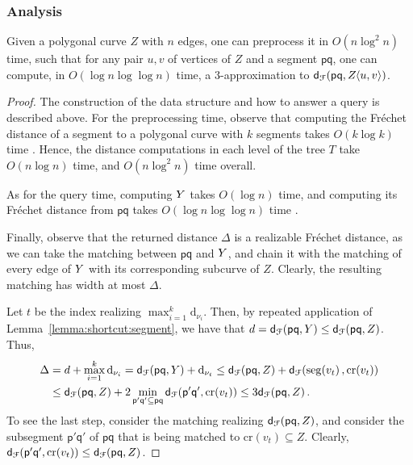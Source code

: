 \documentclass[12pt]{article}
\newcommand{\lemlab}[1]{\label{lemma:#1}}
\newcommand{\lemref}[1]{Lemma~\ref{lemma:#1}}
\newcommand{\ts}{\hspace{0.6pt}}
\newcommand{\Frechet}{Fr\'{e}c{h}e{}t\xspace}\providecommand{\Arr}{\mathop{\mathrm{\EuScript{A}}}}
\newcommand{\distFr}[2]{\mathsf{d}_{\EuScript{F}}\pth{#1, #2}}
\newcommand{\pnt}{\mathsf{p}}
\newcommand{\pntA}{\mathsf{q}}
\newcommand{\SimplifyX}[1]{#1}
\newcommand{\cZ}{{Z}}
\newcommand{\cY}{\SimplifyX{\cYBase}}
\providecommand{\pth}[2][\!]{#1\left({#2}\right)}
\newcommand{\SC}[3]{{#1}\!\!\ts\ts \left\langle  #2, #3 \right\rangle}
\newcommand{\Tree}{T}
\newcommand{\node}{\nu}
\newcommand{\cNode}[1]{\mathrm{c{}r}\pth{#1}}
\newcommand{\segNode}[1]{\mathrm{s{e}g}\pth{#1}}
\newcommand{\frNode}[1]{\mathrm{d}_{#1}}
\numberwithin{figure}{section}
\numberwithin{equation}{section}
\newcommand{\matching}{matching\xspace}
\begin{document}
\subsubsection{Analysis}

\begin{lemma}
    \lemlab{easy:shortcut}Given a polygonal curve $\cZ$ with $n$ edges, one can preprocess
    it in $O(n \log^2 n)$ time, such that for any pair $u,v$ of
    vertices of $\cZ$ and a segment $\pnt \pntA$, one can compute, in
    $O( \log n \log \log n)$ time, a $3$-approximation to
    $\distFr{\pnt\pntA} {\SC{\cZ}{u}{v}}$.
\end{lemma}

\begin{proof}
    The construction of the data structure and how to answer a query
    is described above. For the preprocessing time, observe that
    computing the \Frechet distance of a segment to a polygonal curve
    with $k$ segments takes $O(k \log k)$ time
    \cite{ag-cfdbt-95}. Hence, the distance computations in each level
    of the tree $\Tree$ take $O(n \log n)$ time, and $O(n \log^2 n)$
    time overall.
    
    As for the query time, computing $\cY$ takes $O( \log n)$ time,
    and computing its \Frechet distance from $\pnt \pntA$ takes $O(
    \log n \log \log n)$ time \cite{ag-cfdbt-95}.
    
    Finally, observe that the returned distance $\Delta$ is a
    realizable \Frechet distance, as we can take the \matching{}
    between $\pnt \pntA$ and $\cY$, and chain it with the \matching{}
    of every edge of $\cY$ with its corresponding subcurve of
    $\cZ$. Clearly, the resulting \matching{} has width at most
    $\Delta$.
    
    Let $t$ be the index realizing $\max_{i=1}^k
    \frNode{\node_i}$. Then, by repeated application of
    \lemref{shortcut:segment}, we have that $d = \distFr{\pnt
       \pntA}{\cY} \le \distFr{\pnt \pntA}{\cZ}$. Thus,
    \begin{align*}
        \Delta &= d + \max_{i=1}^k \frNode{\node_i}=\distFr{\pnt \pntA}{\cY} + \frNode{\node_t}\leq \distFr{\pnt \pntA}{\cZ} +
        \distFr{\segNode{v_t}}{\cNode{v_t}}\\
        &\leq \distFr{\pnt \pntA}{\cZ} + 2 \min_{\pnt'\pntA' \subseteq \pnt
           \pntA} \distFr{\pnt'\pntA'}{\cNode{v_t}}\leq 3\distFr{\pnt \pntA}{\cZ}.
    \end{align*}
    To see the last step, consider the \matching{} realizing
    $\distFr{\pnt \pntA}{\cZ}$, and consider the subsegment $\pnt'
    \pntA'$ of $\pnt\pntA$ that is being matched to $\cNode{v_t}
    \subseteq \cZ$. Clearly, $\distFr{\pnt'\pntA'}{\cNode{v_t}} \leq
    \distFr{\pnt \pntA}{\cZ}$.
\end{proof}
\end{document}
